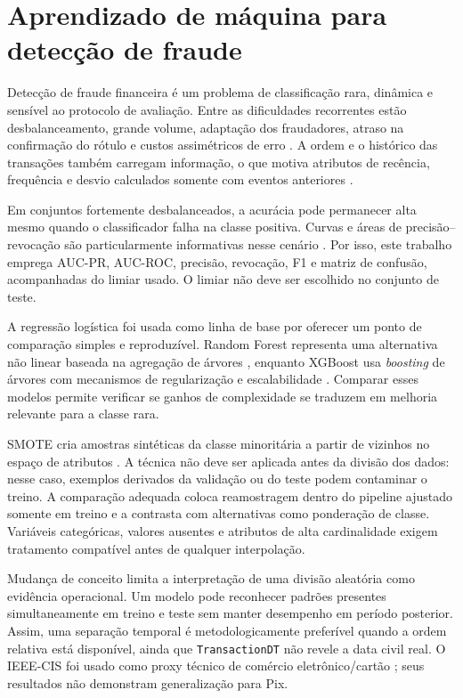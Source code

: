\section{Aprendizado de máquina para detecção de fraude}

Detecção de fraude financeira é um problema de classificação rara, dinâmica e sensível ao protocolo de avaliação. Entre as dificuldades recorrentes estão desbalanceamento, grande volume, adaptação dos fraudadores, atraso na confirmação do rótulo e custos assimétricos de erro \cite{abdallah2016survey,dalpozzolo2018realistic}. A ordem e o histórico das transações também carregam informação, o que motiva atributos de recência, frequência e desvio calculados somente com eventos anteriores \cite{jurgovsky2018sequence}.

Em conjuntos fortemente desbalanceados, a acurácia pode permanecer alta mesmo quando o classificador falha na classe positiva. Curvas e áreas de precisão--revocação são particularmente informativas nesse cenário \cite{saito2015precision}. Por isso, este trabalho emprega AUC-PR, AUC-ROC, precisão, revocação, F1 e matriz de confusão, acompanhadas do limiar usado. O limiar não deve ser escolhido no conjunto de teste.

A regressão logística foi usada como linha de base por oferecer um ponto de comparação simples e reproduzível. Random Forest representa uma alternativa não linear baseada na agregação de árvores \cite{breiman2001random}, enquanto XGBoost usa \emph{boosting} de árvores com mecanismos de regularização e escalabilidade \cite{chen2016xgboost}. Comparar esses modelos permite verificar se ganhos de complexidade se traduzem em melhoria relevante para a classe rara.

SMOTE cria amostras sintéticas da classe minoritária a partir de vizinhos no espaço de atributos \cite{chawla2002smote}. A técnica não deve ser aplicada antes da divisão dos dados: nesse caso, exemplos derivados da validação ou do teste podem contaminar o treino. A comparação adequada coloca reamostragem dentro do pipeline ajustado somente em treino e a contrasta com alternativas como ponderação de classe. Variáveis categóricas, valores ausentes e atributos de alta cardinalidade exigem tratamento compatível antes de qualquer interpolação.

Mudança de conceito limita a interpretação de uma divisão aleatória como evidência operacional. Um modelo pode reconhecer padrões presentes simultaneamente em treino e teste sem manter desempenho em período posterior. Assim, uma separação temporal é metodologicamente preferível quando a ordem relativa está disponível, ainda que \texttt{TransactionDT} não revele a data civil real. O IEEE-CIS foi usado como proxy técnico de comércio eletrônico/cartão \cite{ieee_cis_2019}; seus resultados não demonstram generalização para Pix.

